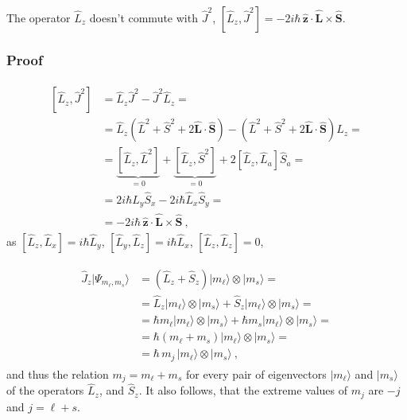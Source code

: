 \documentclass[letterpaper,10pt,english]{jupyterBook}
\begin{document}
\sphinxAtStartPar
The operator \(\hat{L}_z\) doesn’t commute with \(\hat{J}^2\), \(\left[ \hat{L}_z, \hat{J}^2 \right] = - 2 i \hbar \, \hat{\mathbf{z}} \cdot \hat{\mathbf{L}} \times \hat{\mathbf{S}}\).
\subsubsection*{Proof}
\begin{equation*}
\begin{split}\begin{aligned}
  \left[ \hat{L}_z, \hat{J}^2 \right]
  & = \hat{L}_z \hat{J}^2 - \hat{J}^2 \hat{L}_z = \\
  & = \hat{L}_z \left( \hat{L}^2 + \hat{S}^2 + 2 \hat{\mathbf{L}} \cdot \hat{\mathbf{S}} \right) - \left( \hat{L}^2 + \hat{S}^2 + 2 \hat{\mathbf{L}} \cdot \hat{\mathbf{S}}\right) \hat{L}_z = \\
  & = \underbrace{\left[ \hat{L}_z,  \hat{L}^2 \right]}_{ = 0 } + \underbrace{\left[ \hat{L}_z, \hat{S}^2 \right]}_{ = 0} + 2 [\hat{L}_z, \hat{L}_a] \hat{S}_a = \\
  & = 2 i \hbar \hat{L}_y \hat{S}_x - 2 i \hbar \hat{L}_x \hat{S}_y = \\
  & = - 2 i \hbar \, \hat{\mathbf{z}} \cdot \hat{\mathbf{L}} \times \hat{\mathbf{S}} \ ,
\end{aligned}\end{split}
\end{equation*}
\sphinxAtStartPar
as \([\hat{L}_z, \hat{L}_x] = i \hbar \hat{L}_y\), \([\hat{L}_y, \hat{L}_z] = i \hbar \hat{L}_x\), \([\hat{L}_z, \hat{L}_z] = 0\),

\sphinxAtStartPar
{}
\begin{equation*}
\begin{split}\begin{aligned}
  \hat{J}_z | \Psi_{m_\ell, m_s} \rangle
  & = ( \hat{L}_z + \hat{S}_z ) | m_\ell \rangle \otimes | m_s \rangle = \\
  & = \hat{L}_z | m_\ell \rangle \otimes | m_s \rangle + \hat{S}_z | m_\ell \rangle \otimes | m_s \rangle = \\
  & = \hbar m_\ell | m_\ell \rangle \otimes | m_s \rangle + \hbar m_s | m_\ell \rangle \otimes | m_s \rangle = \\
  & = \hbar \left( m_\ell + m_s \right) | m_\ell \rangle \otimes | m_s \rangle = \\
  & = \hbar \, m_j \, | m_\ell \rangle \otimes | m_s \rangle \ ,
\end{aligned}\end{split}
\end{equation*}
\sphinxAtStartPar
and thus the relation \(m_j = m_{\ell} + m_s\) for every pair of eigenvectors \(| m_{\ell} \rangle\) and \(| m_s \rangle\) of the operators \(\hat{L}_z\), and \(\hat{S}_z\). It also follows, that the extreme values of \(m_j\) are \(-j\) and \(j = \ell + s\).
\end{document}

